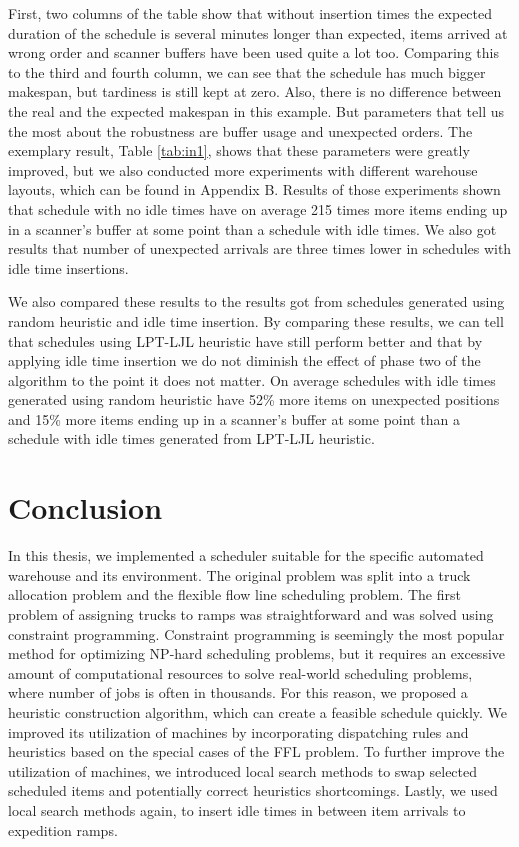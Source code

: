 \documentclass{ctuthesis}
\begin{document}
First, two columns of the table show that without insertion times the expected duration of the schedule is several minutes longer than expected, items arrived at wrong order and scanner buffers have been used quite a lot too. Comparing this to the third and fourth column, we can see that the schedule has much bigger makespan, but tardiness is still kept at zero. Also, there is no difference between the real and the expected makespan in this example. But parameters that tell us the most about the robustness are buffer usage and unexpected orders. The exemplary result, Table \ref{tab:in1}, shows that these parameters were greatly improved, but we also conducted more experiments with different warehouse layouts, which can be found in Appendix B. Results of those experiments shown that schedule with no idle times have on average 215 times more items ending up in a scanner's buffer at some point than a schedule with idle times. We also got results that number of unexpected arrivals are three times lower in schedules with idle time insertions. 

We also compared these results to the results got from schedules generated using random heuristic and idle time insertion. By comparing these results, we can tell that schedules using LPT-LJL heuristic have still perform better and that by applying idle time insertion we do not diminish the effect of phase two of the algorithm to the point it does not matter. On average schedules with idle times generated using random heuristic have 52\% more items on unexpected positions and 15\% more items ending up in a scanner's buffer at some point than a schedule with idle times generated from LPT-LJL heuristic.

\chapter{Conclusion}

In this thesis, we implemented a scheduler suitable for the specific automated warehouse and its environment. 
The original problem was split into a truck allocation problem and the flexible flow line scheduling problem.
The first problem of assigning trucks to ramps was straightforward and was solved using constraint programming. Constraint programming is seemingly the most popular method for optimizing NP-hard scheduling problems, but it requires an excessive amount of computational resources to solve real-world scheduling problems, where number of jobs is often in thousands. For this reason, we proposed a heuristic construction algorithm, which can create a feasible schedule quickly. We improved its utilization of machines by incorporating dispatching rules and heuristics based on the special cases of the FFL problem. To further improve the utilization of machines, we introduced local search methods to swap selected scheduled items and potentially correct heuristics shortcomings. Lastly, we used local search methods again, to insert idle times in between item arrivals to expedition ramps.
\end{document}
